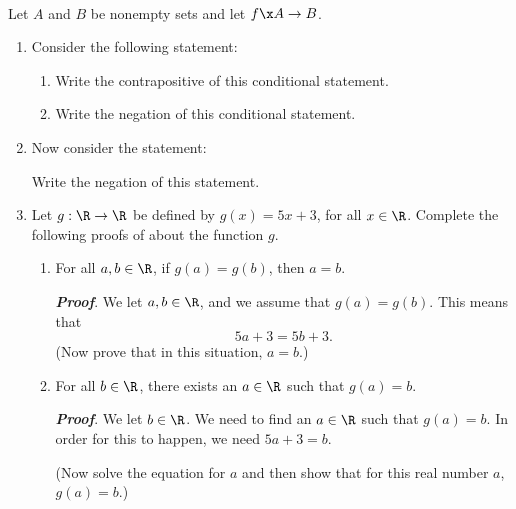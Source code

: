 \begin{previewactivity}
\label{PA:functionstatements} \hfill \\
Let $A$ and $B$ be nonempty sets and let $f\x A \to B$.  
\begin{enumerate}
\item Consider the following statement:

\begin{enumerate} \label{PA:functionstatements1}
\item Write the contrapositive of this conditional statement.

\item Write the negation of this conditional statement.
\end{enumerate}

\item Now consider the statement:
\label{PA:functionstatements2}%
Write the negation of this statement.

\item Let $g:\R \to \R$ be defined by $g ( x ) = 5x + 3$, for all $x \in \R$.  Complete the following proofs of about the function $g$.
\label{PA:functionstatements3}

\begin{enumerate}
\item For all $a, b \in \R$, if $g ( a ) = g ( b )$, then $a = b$.

\noindent
\textbf{\emph{Proof}}.  We let $a, b \in \R$, and we assume that 
$g ( a ) = g ( b )$.  This means that
\[
5a + 3 = 5b + 3.
\]
(Now prove that in this situation, $a = b$.)

\item For all $b \in \R$, there exists an $a \in \R$ such that $g ( a ) = b$.

\noindent
\textbf{\emph{Proof}}.  We let $b \in \R$.  We need to find an $a \in \R$ such that 
$g ( a ) = b$.  In order for this to happen, we need $5a + 3 = b$.

\noindent
(Now solve the equation for $a$ and then show that for this real number $a$, 
$g ( a ) = b$.)
\end{enumerate}
\end{enumerate}

\end{previewactivity}
\hbreak



